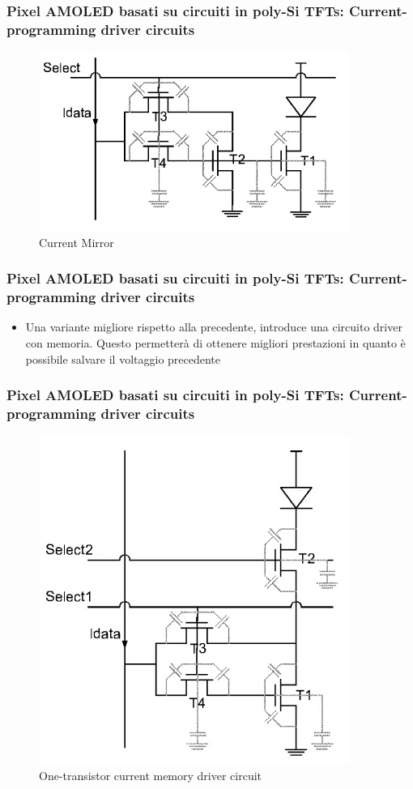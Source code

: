 \documentclass[12pt]{beamer}
\begin{document}
	\begin{frame}
		\frametitle{Pixel AMOLED basati su circuiti in poly-Si TFTs: Current-programming driver circuits}
		\begin{figure}
			\centering
			\includegraphics[width=1\linewidth]{FISICA/current_mirror}
			\caption{Current Mirror}
			\label{fig:currentmirror}
		\end{figure}
	\end{frame}
	\begin{frame}
		\frametitle{Pixel AMOLED basati su circuiti in poly-Si TFTs: Current-programming driver circuits}
		\begin{itemize}
			\item Una variante migliore rispetto alla precedente, introduce una circuito driver con memoria. Questo permetterà di ottenere migliori prestazioni in quanto è possibile salvare il voltaggio precedente
		\end{itemize}
	\end{frame}
	\begin{frame}
		\frametitle{Pixel AMOLED basati su circuiti in poly-Si TFTs: Current-programming driver circuits}
		\begin{figure}
			\centering
			\includegraphics[width=0.6\linewidth]{FISICA/one_tras_current}
			\caption{One-transistor current memory driver circuit}
			\label{fig:onetrascurrent}
		\end{figure}
	\end{frame}
\end{document}
